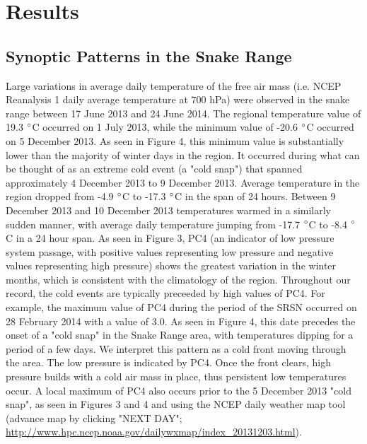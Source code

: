 \documentclass{ametsoc}
\begin{document}
\section{Results} \subsection{Synoptic Patterns in the Snake Range} Large
variations in average daily temperature of the free air mass (i.e. NCEP
Reanalysis 1 daily average temperature at 700 hPa) were observed in the snake
range between 17 June 2013 and 24 June 2014. The regional temperature value of
19.3 $\degree$C occurred on 1 July 2013, while the minimum value of -20.6
$\degree$C occurred on 5 December 2013. As seen in Figure 4, this minimum value
is substantially lower than the majority of winter days in the region. It
occurred during what can be thought of as an extreme cold event (a "cold snap")
that spanned approximately 4 December 2013 to 9 December 2013. Average
temperature in the region dropped from -4.9 $\degree$C to -17.3 $\degree$C in
the span of 24 hours. Between 9 December 2013 and 10 December 2013 temperatures
warmed in a similarly sudden manner, with average daily temperature jumping from
-17.7 $\degree$C to -8.4 $\degree$C in a 24 hour span. As seen in Figure 3, PC4
(an indicator of low pressure system passage, with positive values representing
low pressure and negative values representing high pressure) shows the greatest
variation in the winter months, which is consistent with the climatology of the
region. Throughout our record, the cold events are typically preceeded by high
values of PC4. For example, the maximum value of PC4 during the period of the
SRSN occurred on 28 February 2014 with a value of 3.0. As seen in Figure 4, this
date precedes the onset of a "cold snap" in the Snake Range area, with
temperatures dipping for a period of a few days. We interpret this pattern as a
cold front moving through the area. The low pressure is indicated by PC4. Once
the front clears, high pressure builds with a cold air mass in place, thus
persistent low temperatures occur. A local maximum of PC4 also occurs prior to
the 5 December 2013 "cold snap", as seen in Figures 3 and 4 and using the NCEP
daily weather map tool (advance map by clicking "NEXT DAY";
\url{http://www.hpc.ncep.noaa.gov/dailywxmap/index_20131203.html}).
\end{document}
